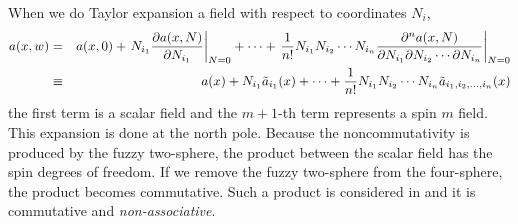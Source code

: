 \documentclass[a4paper,11pt]{article}
\begin{document}
When we do Taylor expansion a field with respect to 
coordinates $N_{i}$, 
\begin{eqnarray}
a(x,w)
&=&a(x,0)
+\left.N_{i_{1}}
\frac{\partial a(x,N)}
{\partial N_{i_{1}} }\right|_{N=0}
+\cdots +\left.
\frac{1}{n!} 
N_{i_{1}}N_{i_{2}}\cdots N_{i_{n}} 
\frac{\partial^{n} a(x,N)} 
{\partial N_{i_{1}}\partial N_{i_{2}} 
\cdots \partial N_{i_{n}} }\right|_{N=0} \cr
&\equiv& a(x)
+N_{i_{1}}\tilde{a}_{i_{1}}(x)
+\cdots +
\frac{1}{n!} 
N_{i_{1}}N_{i_{2}}\cdots N_{i_{n}} 
\tilde{a}_{i_{1},i_{2},\ldots,i_{n}}(x) 
\label{taylorexpansion}
\end{eqnarray}
the first term is a scalar field and the $m+1$-th term 
represents a spin $m$ field. 
This expansion is done at the north pole. 
Because the noncommutativity is produced 
by the fuzzy two-sphere, 
the product between the scalar field has the spin 
degrees of freedom.  
If we remove the fuzzy two-sphere 
from the four-sphere, the product 
becomes commutative. 
Such a product is considered in \cite{ramgoo} and 
it is commutative and {\it non-associative}. 
\end{document}
